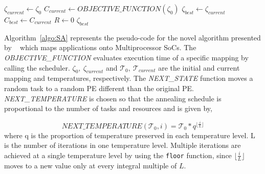 \begin{algorithm}[h!]
  \small{
    \caption{$Simulated\_Annealing(\zeta_0, \mathcal{T}_0)$}
    \label{algo:SA}
    $\zeta_{current} \leftarrow \zeta_0$ \;
    $C_{current} \leftarrow OBJECTIVE\_FUNCTION(\zeta_0)$ \;
    $\zeta_{best} \leftarrow \zeta_{current}$\;
    $C_{best} \leftarrow C_{current}$\;
    $R \leftarrow 0$\;
    \Return $\zeta_{best}$
  }
\end{algorithm}

Algorithm~\ref{algo:SA} represents the pseudo-code for the novel
algorithm presented by ~\cite{hors06} which maps applications onto
Multiprocessor SoCs.  The \textit{OBJECTIVE\_FUNCTION} evaluates
execution time of a specific mapping by calling the
scheduler. $\zeta_0,\ \zeta_{current}$ and $\mathcal{T}_0,\
\mathcal{T}_{current}$ are the initial and current mapping and
temperatures, respectively. The \textit{NEXT\_STATE} function moves a
random task to a random PE different than the original
PE. \textit{NEXT\_TEMPERATURE} is chosen so that the annealing schedule
is proportional to the number of tasks and resources and is given by,

\begin{equation}
\label{eq:3}
\textit{NEXT\_TEMPERATURE}(\mathcal{T}_0, i) = \mathcal{T}_0*q^{\lfloor
\frac{i}{L} \rfloor}
\end{equation}
\noindent
where q is the proportion of temperature preserved in each temperature
level. %
L is the number of iterations in one temperature level. Multiple
iterations are achieved at a single temperature level by using the
\texttt{floor} function, since $\lfloor \frac{i}{L} \rfloor$ moves to a
new value only at every integral multiple of $L$.

